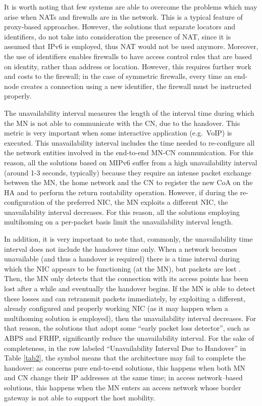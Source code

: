 \documentclass[preprint,12pt]{elsarticle}
\begin{document}
It is worth noting that few systems are able to overcome the problems which may arise when NATs and firewalls are in the network. 
This is a typical feature of proxy-based approaches. 
However, the solutions that separate locators and identifiers, do not take into consideration the presence of NAT, since it is assumed that IPv6 is employed, thus NAT would not be used anymore.
Moreover, the use of identifiers enables firewalls to have access control rules 
that are based on identity, rather than address or location. However, this 
requires further work and costs to the firewall; in the case of symmetric firewalls, 
every time an end-node creates a connection using a new identifier, the 
firewall must be instructed properly. 

The unavailability interval measures the length of the interval time during 
which the MN is not able to communicate with the CN, due to the handover. This 
metric is very important when some interactive application (e.g.~VoIP) is 
executed. 
This unavailability interval includes the time needed to re-configure all the 
network entities involved in the end-to-end MN-CN communication. 
For this reason, all the solutions based on MIPv6 suffer from a high unavailability 
interval (around 1-3 seconds, typically) because they require an intense packet 
exchange between the MN, the home network and the CN to register the new 
\ac{CoA} on the \ac{HA} and to perform the return routability 
operation. 
However, if during the re-configuration of the preferred NIC, the MN exploits a different NIC, the unavailability interval decreases. 
For this reason, all the solutions employing multihoming on a per-packet basis limit the unavailability interval length. 

In addition, it is very important to note that, commonly, the unavailability time interval does not include the handover time only. When a network becomes unavailable (and thus a handover is required) there is a time interval during which the NIC appears to be functioning (at the MN), but packets are lost \cite{ngmast}. 
Then, the MN only detects that the connection with its access points has been lost after a while and eventually the handover begins. If the MN is able to detect these losses and can retransmit packets immediately, by exploiting a different, already configured and properly working NIC (as it may happen when a multihoming solution is employed), then the unavailability interval decreases. 
For that reason, the solutions that adopt some “early packet loss detector”, such as ABPS and FRHP, significantly reduce the unavailability interval.
For the sake of completeness, in the row labeled ``Unavailability Interval Due to Handover'' in Table \ref{tab2}, the symbol  
means that the architecture may fail to complete the handover: as concerns pure end-to-end solutions, this happens when both MN and CN change their IP addresses at the same time; in access network–based solutions, this happens when the MN enters an access network whose border gateway is not able to support the host mobility.
\end{document}
